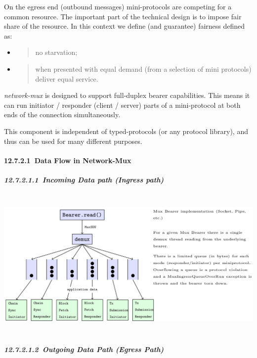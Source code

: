 \documentclass[11pt,a4paper]{article}
\begin{document}
On the egress end (outbound messages) mini-protocols are competing for a
common resource. The important part of the technical design is to impose
fair share of the resource. In this context we define (and guarantee)
fairness defined as:

\begin{itemize}
\item
  \begin{quote}
  no starvation;
  \end{quote}
\item
  \begin{quote}
  when presented with equal demand (from a selection of mini protocols)
  deliver equal service.
  \end{quote}
\end{itemize}

\emph{network-mux} is designed to support full-duplex bearer
capabilities. This means it can run initiator / responder (client /
server) parts of a mini-protocol at both ends of the connection
simultaneously.

This component is independent of typed-protocols (or any protocol
library), and thus can be used for many different purposes.

\hypertarget{data-flow-in-network-mux}{%
\paragraph{​12.7.2.1​~Data Flow in
Network-Mux}\label{data-flow-in-network-mux}}

\hypertarget{incoming-data-path-ingress-path}{%
\subparagraph{​12.7.2.1.1​~Incoming Data path (Ingress
path)}\label{incoming-data-path-ingress-path}}

\includegraphics[width=6.27083in,height=2.875in]{./media/image2.png}

\hypertarget{outgoing-data-path-egress-path}{%
\subparagraph{​12.7.2.1.2​~Outgoing Data Path (Egress
Path)}\label{outgoing-data-path-egress-path}}
\end{document}
